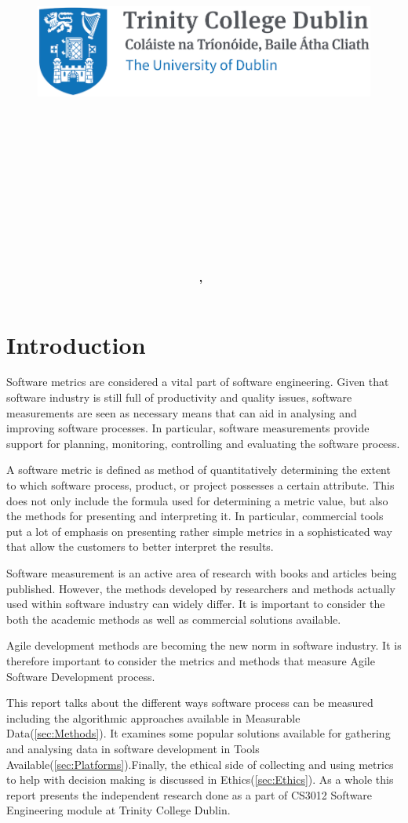 \documentclass[11pt]{article}
\title{
\vspace{-1in}
\begin{figure}[!ht]
\flushleft
\includegraphics[width=0.4\linewidth]{reduced-trinity.png}
\end{figure}
\vspace{-0.5cm}
\hrulefill \\
\vspace{0.5cm}
\textmd{\textbf{\moduleCode\ \moduleName}}\\
\textmd{\textbf{\assignmentTitle}}\\
\vspace{0.5cm}
\hrulefill \\
}
\author{\textbf{\authorName,\ \authorID}}
\date{\reportDate}
\begin{document}
\lstset{language=Java, captionpos=b, frame=single}
\captionsetup{width=.8\linewidth} 

\maketitle
\tableofcontents
\vspace{0.5in}

\section{Introduction}
\label{sec:Intro}

Software metrics are considered a vital part of software engineering.\cite{ieee-measurement-programs} Given that software industry is still full of productivity and quality issues, software measurements are seen as necessary means that can aid in analysing and improving software processes. In particular, software measurements provide support for planning, monitoring, controlling and evaluating the software process.\cite{Briand:2002:OPG:630832.631301} 

A software metric is defined as method of quantitatively determining the extent to which software process, product, or project possesses a certain attribute. This does not only include the formula used for determining a metric value, but also the methods for presenting and interpreting it.\cite{Daskalantonakis:1992:PVS:141344.141353} In particular, commercial tools put a lot of emphasis on presenting rather simple metrics in a sophisticated way that allow the customers to better interpret the results.

Software measurement is an active area of research with books and articles being published. However, the methods developed by researchers and methods actually used within software industry can widely differ. It is important to consider the both the academic methods as well as commercial solutions available.

Agile development methods are becoming the new norm in software industry.\cite{TARHAN2014477}\cite{hp-agile-report} It is therefore important to consider the metrics and methods that measure Agile Software Development process.

This report talks about the different ways software process can be measured including the algorithmic approaches available in Measurable Data(\ref{sec:Methods}). It examines some popular solutions available for gathering and analysing data in software development in Tools Available(\ref{sec:Platforms}).Finally, the ethical side of collecting and using metrics to help with decision making is discussed in Ethics(\ref{sec:Ethics}). 
As a whole this report presents the independent research done as a part of CS3012 Software Engineering module at Trinity College Dublin.
\end{document}
